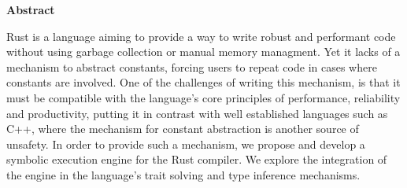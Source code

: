
\clearemptydoublepage
{}
{}

\vspace*{2cm}
\begin{center}
{\Large \textbf{Abstract}}
\end{center}
\vspace{1cm}

Rust is a language aiming to provide a way to write robust and performant code
without using garbage collection or manual memory managment. Yet it lacks of a
mechanism to abstract constants, forcing users to repeat code in cases where
constants are involved. One of the challenges of writing this mechanism, is
that it must be compatible with the language's core principles of performance,
reliability and productivity, putting it in contrast with well established
languages such as C++, where the mechanism for constant abstraction is another
source of unsafety. In order to provide such a mechanism, we propose and
develop a symbolic execution engine for the Rust compiler. We explore the
integration of the engine in the language's trait solving and type inference
mechanisms.

